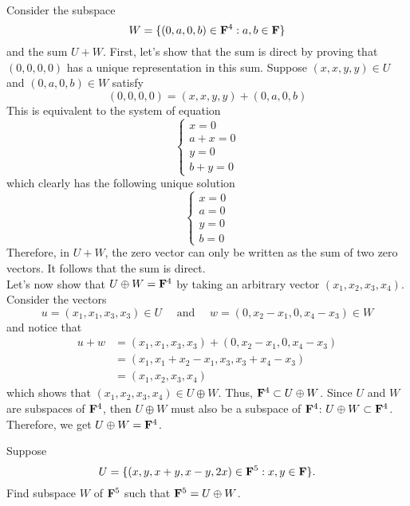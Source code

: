 \begin{solution}
    \\ Consider the subspace
    $$W = \{(0,a,0,b) \in \mathbf{F}^4 : a,b \in \mathbf{F}\}$$
    and the sum $U + W$. First, let's show that the sum is direct by proving that $(0,0,0,0)$ has a unique representation in this sum. Suppose $(x,x,y,y) \in U$ and $(0,a,0,b) \in W$ satisfy
    $$(0,0,0,0) = (x,x,y,y) + (0,a,0,b)$$
    This is equivalent to the system of equation
    $$\begin{cases}
        x = 0 \\ a+x = 0 \\ y = 0 \\ b + y = 0
    \end{cases}$$
    which clearly has the following unique solution
    $$\begin{cases}
        x = 0 \\ a = 0 \\ y = 0 \\ b = 0
    \end{cases}$$
    Therefore, in $U + W$, the zero vector can only be written as the sum of two zero vectors. It follows that the sum is direct.\\
    Let's now show that $U \oplus W = \mathbf{F}^4$ by taking an arbitrary vector $(x_1, x_2, x_3, x_4)$. Consider the vectors 
    $$u = (x_1, x_1, x_3, x_3) \in U \quad \text{ and } \quad w = (0, x_2 - x_1, 0, x_4 - x_3) \in W$$
    and notice that
    \begin{align*}
        u+w &= (x_1, x_1, x_3, x_3) + (0, x_2 - x_1, 0, x_4 - x_3) \\
        &= (x_1, x_1 + x_2 - x_1, x_3, x_3 + x_4 - x_3) \\
        &= (x_1, x_2, x_3, x_4)
    \end{align*}
    which shows that $(x_1, x_2, x_3, x_4) \in U \oplus W$. Thus, $\mathbf{F}^4 \subset U \oplus W$. Since $U$ and $W$ are subspaces of $\mathbf{F}^4$, then $U \oplus W$ must also be a subspace of $\mathbf{F}^4$: $U \oplus W \subset \mathbf{F}^4$. Therefore, we get $U \oplus W = \mathbf{F}^4$. \\
\end{solution}

\begin{exercise}
    Suppose 
    $$U = \{(x, y, x+y, x-y, 2x) \in \mathbf{F}^5 : x,y \in \mathbf{F} \}.$$
    Find subspace $W$ of $\mathbf{F}^5$ such that $\mathbf{F}^5 = U \oplus W$. \\
\end{exercise}

